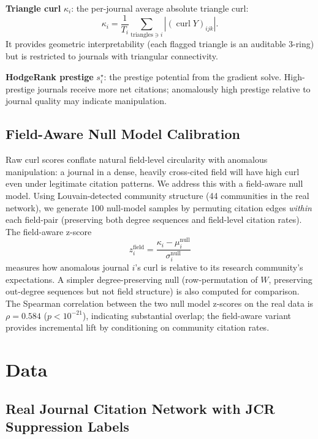 \documentclass[twocolumn,11pt,letterpaper]{article}
\begin{document}
\smallskip\noindent\textbf{Triangle curl} $\kappa_i$: the per-journal average
absolute triangle curl:
\begin{equation}
  \kappa_i = \frac{1}{T_i} \sum_{\text{triangles} \ni i} |(\operatorname{curl} Y)_{ijk}|.
\end{equation}
It provides geometric interpretability (each flagged triangle is an auditable
3-ring) but is restricted to journals with triangular connectivity.

\smallskip\noindent\textbf{HodgeRank prestige} $s^\star_i$: the prestige
potential from the gradient solve. High-prestige journals receive more net
citations; anomalously high prestige relative to journal quality may indicate
manipulation.

\subsection{Field-Aware Null Model Calibration}

Raw curl scores conflate natural field-level circularity with anomalous
manipulation: a journal in a dense, heavily cross-cited field will have high
curl even under legitimate citation patterns. We address this with a field-aware
null model. Using Louvain-detected community structure (44 communities in the
real network), we generate 100 null-model samples by permuting citation edges
\emph{within} each field-pair (preserving both degree sequences and field-level
citation rates). The field-aware z-score
\begin{equation}
  z_i^{\mathrm{field}} = \frac{\kappa_i - \mu_i^{\mathrm{null}}}{\sigma_i^{\mathrm{null}}}
\end{equation}
measures how anomalous journal $i$'s curl is relative to its research
community's expectations. A simpler degree-preserving null (row-permutation of
$W$, preserving out-degree sequences but not field structure) is also computed
for comparison. The Spearman correlation between the two null model z-scores on
the real data is $\rho = 0.584$ ($p < 10^{-21}$), indicating substantial
overlap; the field-aware variant provides incremental lift by conditioning on
community citation rates.

\section{Data}
\label{sec:data}

\subsection{Real Journal Citation Network with JCR Suppression Labels}
\end{document}
